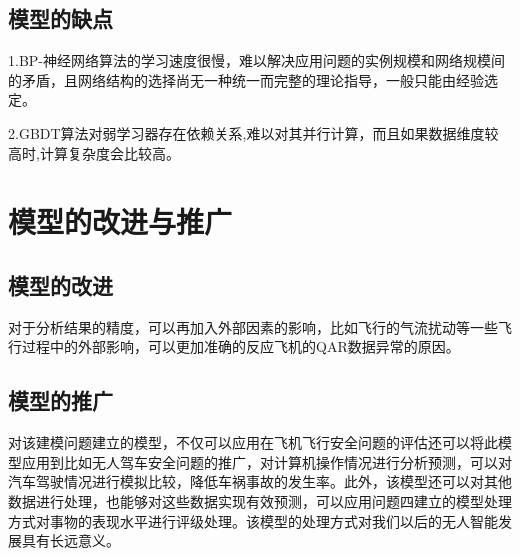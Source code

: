 \documentclass[UTF8]{ctexart}
\begin{document}
\subsection{模型的缺点}
1.BP-神经网络算法的学习速度很慢，难以解决应用问题的实例规模和网络规模间的矛盾，且网络结构的选择尚无一种统一而完整的理论指导，一般只能由经验选定。\par 
2.GBDT算法对弱学习器存在依赖关系,难以对其并行计算，而且如果数据维度较高时,计算复杂度会比较高。 \par 

\section{模型的改进与推广}
\subsection{模型的改进}
对于分析结果的精度，可以再加入外部因素的影响，比如飞行的气流扰动等一些飞行过程中的外部影响，可以更加准确的反应飞机的QAR数据异常的原因。 \par 
\subsection{模型的推广}
对该建模问题建立的模型，不仅可以应用在飞机飞行安全问题的评估还可以将此模型应用到比如无人驾车安全问题的推广，对计算机操作情况进行分析预测，可以对汽车驾驶情况进行模拟比较，降低车祸事故的发生率。此外，该模型还可以对其他数据进行处理，也能够对这些数据实现有效预测，可以应用问题四建立的模型处理方式对事物的表现水平进行评级处理。该模型的处理方式对我们以后的无人智能发展具有长远意义。  \par 
\end{document}
